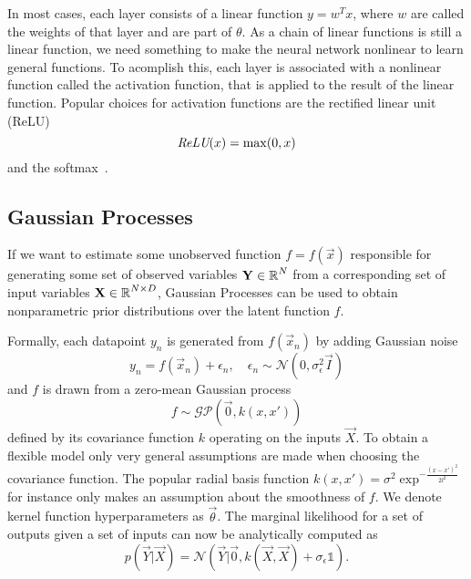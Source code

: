 In most cases, each layer consists of a linear function $y=w^T x$, where $w$
are called the weights of that layer and are part of $\theta$. As a chain of
linear functions is still a linear function, we need something to make the
neural network nonlinear to learn general functions. To acomplish this, each
layer is associated with a nonlinear function called the activation function,
that is applied to the result of the linear function. Popular choices for
activation functions are the rectified linear unit (ReLU)
\begin{equation}
    \operatorname{\textit{ReLU}}(x)=\max(0, x)
\end{equation}
and the softmax~\cite{Goodfellow-et-al-2016}. %

\subsection{Gaussian Processes}%
\label{sub:gaussian_processes}

If we want to estimate some unobserved function $f = f(\vec{x})$ responsible
for generating some set of observed variables $\mathbf{Y} \in \operatorname{\mathbb{R}}^{N}$
from a corresponding set of input variables $\mathbf{X} \in \operatorname{\mathbb{R}}^{N \times D}$,
Gaussian Processes can be used to obtain nonparametric prior distributions over
the latent function $f$.

Formally, each datapoint $y_n$ is generated from $f(\vec{x}_n)$ by adding
Gaussian noise
\begin{equation}
y_n = f(\vec{x}_n) + \epsilon_n, \quad
\epsilon_n \sim \mathcal{N}(0,\sigma_{\epsilon}^2\vec{I})
\end{equation}
and $f$ is drawn from a zero-mean Gaussian process
\begin{equation}
f \sim \mathcal{GP}(\vec{0},k(x,x'))
\end{equation}
defined by its covariance function $k$ operating on the inputs $\vec{X}$. To
obtain a flexible model only very general assumptions are made when choosing
the covariance function. The popular radial basis function $k(x, x')=\sigma^2
\exp^{-\frac{(x-x')^2}{2l^2}}$ for instance only makes an assumption about the
smoothness of $f$. We denote kernel function hyperparameters as
$\vec{\theta}$.
The marginal likelihood for a set of outputs given a set of inputs can now be analytically computed as~\cite{damianou2013deep}
\begin{equation}
    p(\vec{Y} | \vec{X}) = \mathcal{N}(\vec{Y}|\vec{0}, k(\vec{X}, \vec{X}) +
    \sigma_{\epsilon}\mathbb{1}).
\end{equation}

